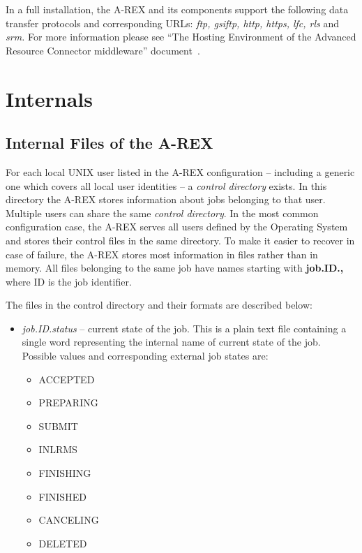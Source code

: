 \documentclass{article}                            %
\begin{document}
In a full installation, the A-REX and its components support the
following data transfer protocols and corresponding URLs: \emph{ftp,
  gsiftp, http, https, lfc, rls} and \emph{srm.} For more information
please see ``The Hosting Environment of the Advanced Resource
Connector middleware'' document~\cite{hed}.

\section{Internals\label{section:internals}}

\subsection{Internal Files of the A-REX}

For each local UNIX user listed in the A-REX configuration -- including
a generic one which covers all local user identities -- a \textit{control
directory} exists. In this directory the A-REX stores information
about jobs belonging to that user. Multiple users can share the same
\textit{control directory}. In the most common configuration case, the A-REX
serves all users defined by the Operating System and stores their control
files in the same directory. To make it easier to recover in case of failure,
the A-REX stores most information in files rather than in memory.
All files belonging to the same job have names starting with \textbf{job.ID.,}
where ID is the job identifier.

The files in the control directory and their formats are described
below:

\begin{itemize}
\item \textit{job.ID.status} -- current state of the job. This is a plain
text file containing a single word representing the internal name
of current state of the job. Possible values and corresponding external
job states are:

\begin{itemize}
\item ACCEPTED
\item PREPARING
\item SUBMIT
\item INLRMS
\item FINISHING
\item FINISHED
\item CANCELING
\item DELETED
\end{itemize}
\end{itemize}
\end{document}
